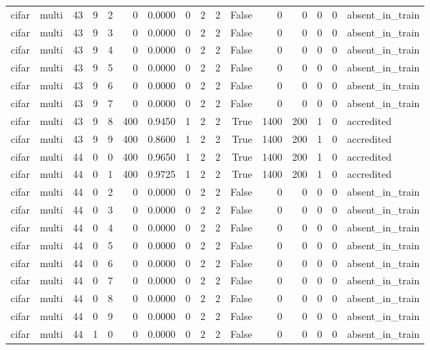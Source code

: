 \begin{tabular}{llrrrrrrrrrrrrrl}
cifar & multi & 43 & 9 & 2 & 0 & 0.0000 & 0 & 2 & 2 & False & 0 & 0 & 0 & 0 & absent\_in\_train \\
cifar & multi & 43 & 9 & 3 & 0 & 0.0000 & 0 & 2 & 2 & False & 0 & 0 & 0 & 0 & absent\_in\_train \\
cifar & multi & 43 & 9 & 4 & 0 & 0.0000 & 0 & 2 & 2 & False & 0 & 0 & 0 & 0 & absent\_in\_train \\
cifar & multi & 43 & 9 & 5 & 0 & 0.0000 & 0 & 2 & 2 & False & 0 & 0 & 0 & 0 & absent\_in\_train \\
cifar & multi & 43 & 9 & 6 & 0 & 0.0000 & 0 & 2 & 2 & False & 0 & 0 & 0 & 0 & absent\_in\_train \\
cifar & multi & 43 & 9 & 7 & 0 & 0.0000 & 0 & 2 & 2 & False & 0 & 0 & 0 & 0 & absent\_in\_train \\
cifar & multi & 43 & 9 & 8 & 400 & 0.9450 & 1 & 2 & 2 & True & 1400 & 200 & 1 & 0 & accredited \\
cifar & multi & 43 & 9 & 9 & 400 & 0.8600 & 1 & 2 & 2 & True & 1400 & 200 & 1 & 0 & accredited \\
cifar & multi & 44 & 0 & 0 & 400 & 0.9650 & 1 & 2 & 2 & True & 1400 & 200 & 1 & 0 & accredited \\
cifar & multi & 44 & 0 & 1 & 400 & 0.9725 & 1 & 2 & 2 & True & 1400 & 200 & 1 & 0 & accredited \\
cifar & multi & 44 & 0 & 2 & 0 & 0.0000 & 0 & 2 & 2 & False & 0 & 0 & 0 & 0 & absent\_in\_train \\
cifar & multi & 44 & 0 & 3 & 0 & 0.0000 & 0 & 2 & 2 & False & 0 & 0 & 0 & 0 & absent\_in\_train \\
cifar & multi & 44 & 0 & 4 & 0 & 0.0000 & 0 & 2 & 2 & False & 0 & 0 & 0 & 0 & absent\_in\_train \\
cifar & multi & 44 & 0 & 5 & 0 & 0.0000 & 0 & 2 & 2 & False & 0 & 0 & 0 & 0 & absent\_in\_train \\
cifar & multi & 44 & 0 & 6 & 0 & 0.0000 & 0 & 2 & 2 & False & 0 & 0 & 0 & 0 & absent\_in\_train \\
cifar & multi & 44 & 0 & 7 & 0 & 0.0000 & 0 & 2 & 2 & False & 0 & 0 & 0 & 0 & absent\_in\_train \\
cifar & multi & 44 & 0 & 8 & 0 & 0.0000 & 0 & 2 & 2 & False & 0 & 0 & 0 & 0 & absent\_in\_train \\
cifar & multi & 44 & 0 & 9 & 0 & 0.0000 & 0 & 2 & 2 & False & 0 & 0 & 0 & 0 & absent\_in\_train \\
cifar & multi & 44 & 1 & 0 & 0 & 0.0000 & 0 & 2 & 2 & False & 0 & 0 & 0 & 0 & absent\_in\_train \\

\end{tabular}
